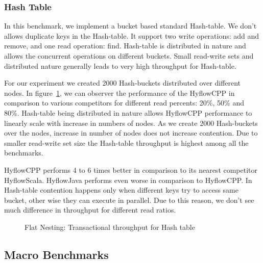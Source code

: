 \documentclass[12pt,english]{report}
\begin{document}
\subsubsection{Hash Table}
In this benchmark, we implement a bucket based standard Hash-table. We don't allows duplicate keys in the Hash-table. It support two write operations: add and remove, and one read operation: find. Hash-table is distributed in nature and allows the concurrent operations on different buckets. Small read-write sets and distributed nature generally leads to very high throughput for Hash-table.

For our experiment we created 2000 Hash-buckets distributed over different nodes. In figure~\ref{Fig:flatHashTable}, we can observer the performance of the HyflowCPP in comparison to various competitors for different read percents: 20\%, 50\% and 80\%. Hash-table being distributed in nature allows HyflowCPP performance to linearly scale with increase in numbers of nodes. As we create 2000 Hash-buckets over the nodes, increase in number of nodes does not increase contention. Due to smaller read-write set size the Hash-table throughput is highest among all the benchmarks.

HyflowCPP performs 4 to 6 times better in comparison to its nearest competitor HyflowScala. HyflowJava performs even worse in comparison to HyflowCPP. In Hash-table contention happens only when different keys try to access same bucket, other wise they can execute in parallel. Due to this reason, we don't see much difference in throughput for different read ratios.

\begin{figure}[H]
\centering
{}
\end{figure}
\begin{figure}[H]
\centering
{}
\end{figure}
\begin{figure}[H]
\centering
{}
\caption{Flat Nesting: Transactional throughput for Hash table}
\label{Fig:flatHashTable}
\end{figure}

\subsection{Macro Benchmarks}
\end{document}
